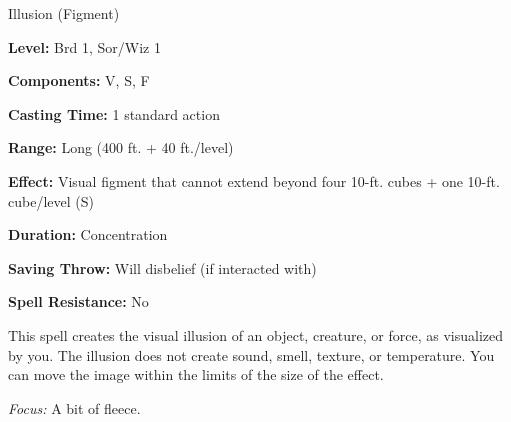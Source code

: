 
Illusion (Figment)

\textbf{Level:} Brd 1, Sor/Wiz 1

\textbf{Components:} V, S, F

\textbf{Casting Time:} 1 standard action

\textbf{Range:} Long (400 ft. + 40 ft./level)

\textbf{Effect:} Visual figment that cannot extend beyond four 10-ft. cubes + one 
10-ft. cube/level (S)

\textbf{Duration:} Concentration

\textbf{Saving Throw:} Will disbelief (if interacted with)

\textbf{Spell Resistance:} No

This spell creates the visual illusion of an object, creature, or force, as visualized 
by you. The illusion does not create sound, smell, texture, or temperature. You 
can move the image within the limits of the size of the effect.

\textit{Focus:} A bit of fleece.

